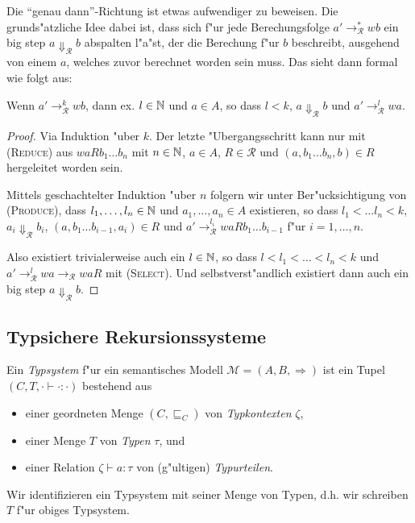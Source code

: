 \documentclass[12pt,a4paper,final]{article}
\begin{document}
Die ``genau dann''-Richtung ist etwas aufwendiger zu beweisen. Die grund\-s"atzliche Idee dabei
ist, dass sich f"ur jede Berechungsfolge \mbox{$a' \rightarrow_{\mathcal{R}}^* wb$} ein big step
\mbox{$a \Downarrow_{\mathcal{R}} b$} abspalten l"a"st, der die Berechung f"ur $b$ beschreibt, ausgehend
von einem $a$, welches zuvor berechnet worden sein muss. Das sieht dann formal wie folgt aus:
\begin{lemma}
  Wenn \mbox{$a' \rightarrow_{\mathcal{R}}^k wb$}, dann ex. \mbox{$l \in \mathbb N$} und \mbox{$a \in A$}, so dass
  \mbox{$l < k$}, \mbox{$a \Downarrow_{\mathcal{R}} b$} und \mbox{$a' \rightarrow_{\mathcal{R}}^l wa$}.
\end{lemma}

\begin{proof}
  Via Induktion "uber $k$.
  Der letzte "Ubergangsschritt kann nur mit \textsc{(Reduce)} aus \mbox{$waRb_1 \ldots b_n$}
  mit \mbox{$n \in \mathbb N$}, \mbox{$a \in A$}, \mbox{$R \in \mathcal{R}$} und \mbox{$(a,b_1 \ldots b_n,b) \in R$}
  hergeleitet worden sein.

  Mittels geschachtelter Induktion "uber $n$ folgern wir unter Ber"ucksichtigung von \textsc{(Produce)},
  dass \mbox{$l_1,\ldots,l_n \in \mathbb N$} und \mbox{$a_1,\ldots,a_n \in A$} existieren, so dass
  \mbox{$l_1 < \ldots l_n < k$}, \mbox{$a_i \Downarrow_{\mathcal{R}} b_i$}, \mbox{$(a,b_1 \ldots b_{i-1},a_i) \in R$}
  und \mbox{$a' \rightarrow_{\mathcal{R}}^{l_i} waRb_1 \ldots b_{i-1}$} f"ur \mbox{$i=1,\ldots,n$}.

  Also existiert trivialerweise auch ein \mbox{$l \in \mathbb N$}, so dass \mbox{$l < l_1 < \ldots < l_n < k$} und
  \mbox{$a' \rightarrow_{\mathcal{R}}^l wa \rightarrow_{\mathcal{R}} waR$} mit \textsc{(Select)}. Und selbstverst"andlich
  existiert dann auch ein big step $a \Downarrow_{\mathcal{R}} b$.
\end{proof}



\subsection{Typsichere Rekursionssysteme}
\label{sec:Typsichere_Rekursionssysteme}

Ein \emph{Typsystem} f"ur ein semantisches Modell \mbox{$\mathcal{M} = (A,B,\Rightarrow)$}
ist ein Tupel \mbox{$(C,T,\cdot\vdash\cdot:\cdot)$} bestehend aus
\begin{itemize}
\item einer geordneten Menge \mbox{$(C,\sqsubseteq_C)$} von \emph{Typkontexten} $\zeta$,
\item einer Menge $T$ von \emph{Typen} $\tau$, und
\item einer Relation \mbox{$\zeta\vdash a:\tau$} von (g"ultigen) \emph{Typurteilen}.
\end{itemize}
Wir identifizieren ein Typsystem mit seiner Menge von Typen, d.h. wir schreiben $T$ f"ur obiges
Typsystem.
\end{document}
